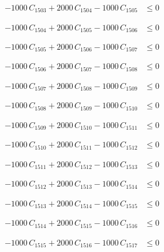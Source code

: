 \documentclass[a4paper,11pt]{article}
\begin{document}
\begin{align}
-1000\,C_{1503} + 2000\,C_{1504} - 1000\,C_{1505} &\leq 0 \nonumber
\end{align}

\begin{align}
-1000\,C_{1504} + 2000\,C_{1505} - 1000\,C_{1506} &\leq 0 \nonumber
\end{align}

\begin{align}
-1000\,C_{1505} + 2000\,C_{1506} - 1000\,C_{1507} &\leq 0 \nonumber
\end{align}

\begin{align}
-1000\,C_{1506} + 2000\,C_{1507} - 1000\,C_{1508} &\leq 0 \nonumber
\end{align}

\begin{align}
-1000\,C_{1507} + 2000\,C_{1508} - 1000\,C_{1509} &\leq 0 \nonumber
\end{align}

\begin{align}
-1000\,C_{1508} + 2000\,C_{1509} - 1000\,C_{1510} &\leq 0 \nonumber
\end{align}

\begin{align}
-1000\,C_{1509} + 2000\,C_{1510} - 1000\,C_{1511} &\leq 0 \nonumber
\end{align}

\begin{align}
-1000\,C_{1510} + 2000\,C_{1511} - 1000\,C_{1512} &\leq 0 \nonumber
\end{align}

\begin{align}
-1000\,C_{1511} + 2000\,C_{1512} - 1000\,C_{1513} &\leq 0 \nonumber
\end{align}

\begin{align}
-1000\,C_{1512} + 2000\,C_{1513} - 1000\,C_{1514} &\leq 0 \nonumber
\end{align}

\begin{align}
-1000\,C_{1513} + 2000\,C_{1514} - 1000\,C_{1515} &\leq 0 \nonumber
\end{align}

\begin{align}
-1000\,C_{1514} + 2000\,C_{1515} - 1000\,C_{1516} &\leq 0 \nonumber
\end{align}

\begin{align}
-1000\,C_{1515} + 2000\,C_{1516} - 1000\,C_{1517} &\leq 0 \nonumber
\end{align}
\end{document}
